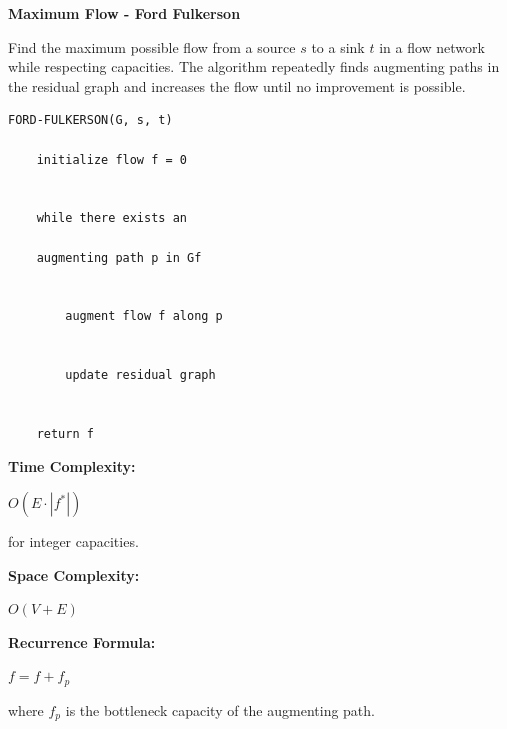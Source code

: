\documentclass[a4paper,12pt]{article}
\begin{document}
\begin{tcolorbox}[
    colback=gray!30,
    colframe=black,
    boxrule=1pt,
    arc=0mm
]

\begin{tcolorbox}[
    colback=gray!10,
    colframe=black,
    arc=0mm
]
\centering
{\Huge\bfseries Maximum Flow - Ford Fulkerson}
\end{tcolorbox}


\begin{tcolorbox}[
    colback=gray!10,
    colframe=black,
    arc=0mm
]
\small
Find the maximum possible flow from a source $s$ to a sink $t$ in a flow
network while respecting capacities.
The algorithm repeatedly finds augmenting paths in the residual graph and
increases the flow until no improvement is possible.
\end{tcolorbox}


\begin{tcolorbox}[
    colback=black!5,
    colframe=black,
    arc=0mm,
    title=Pseudo-code
]
\tiny
\begin{lstlisting}
FORD-FULKERSON(G, s, t)

    initialize flow f = 0


    while there exists an

    augmenting path p in Gf


        augment flow f along p


        update residual graph


    return f
\end{lstlisting}
\end{tcolorbox}


\begin{tcolorbox}[
    colback=cyan!20,
    colframe=black,
    arc=0mm
]
\small
\textbf{Time Complexity:}

$O(E \cdot |f^*|)$

for integer capacities.
\end{tcolorbox}


\begin{tcolorbox}[
    colback=violet!20,
    colframe=black,
    arc=0mm
]
\small
\textbf{Space Complexity:}

$O(V+E)$
\end{tcolorbox}


\begin{tcolorbox}[
    colback=pink!20,
    colframe=black,
    arc=0mm
]
\small
\textbf{Recurrence Formula:}

$f = f + f_p$

where $f_p$ is the bottleneck capacity of the augmenting path.
\end{tcolorbox}

\end{tcolorbox}
\end{document}
